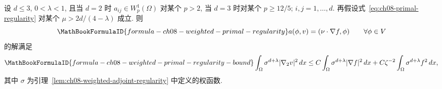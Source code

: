 \begin{Lemma}
\label{lem:ch08-weighted-primal-regularity}
设 $d\leq3$, $0<\lambda<1$, 且当 $d=2$ 时 $a_{ij}\in W_p^1(\Omega)$ 对某个 $p>2$, 当 $d=3$ 时对某个 $p\geq12/5$; $i,j=1,\ldots,d$. 再假设式~\eqref{eq:ch08-primal-regularity} 对某个 $\mu>2d/(4-\lambda)$ 成立. 则
\[
\MathBookFormulaID{formula-ch08-weighted-primal-regularity}
a(\phi,v)=(\nu\cdot\nabla f,\phi)
\qquad\forall\phi\in V
\]
的解满足
\[
\MathBookFormulaID{formula-ch08-weighted-primal-regularity-bound}
\int_\Omega\sigma^{d+\lambda}|\nabla_2v|^2\,dx
\leq C\int_\Omega\sigma^{d+\lambda}|\nabla f|^2\,dx
+C\zeta^{-2}\int_\Omega\sigma^{d+\lambda}f^2\,dx,
\]
其中 $\sigma$ 为引理~\ref{lem:ch08-weighted-adjoint-regularity} 中定义的权函数.
\end{Lemma}
